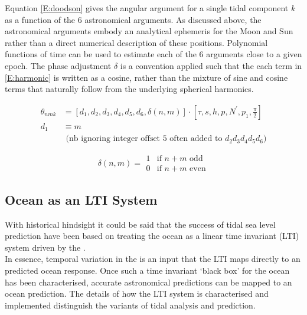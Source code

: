 Equation \ref{E:doodson} gives the angular argument for a single tidal component $k$ as a function of the 6 astronomical arguments.   As discussed above, the astronomical arguments embody an analytical ephemeris for the Moon and Sun rather than a direct numerical description of these positions.  Polynomial functions of time can be used to estimate each of the 6 arguments close to a given epoch.  The phase adjustment $\delta$ is a convention applied such that the each term in \ref{E:harmonic} is written as a cosine, rather than the mixture of sine and cosine terms that naturally follow from the underlying spherical harmonics.

\begin{align}
\label{E:doodson}
\theta_{nmk}  &= \left[ d_1 , d_2 , d_3 , d_4 , d_5 ,d_6 , \delta(n,m)  \right] \cdot \left[ \tau , s  , h , p , N^\prime , p_1 , \frac{\pi}{2}   \right]   \\
          d_1 &\equiv m \nonumber \\
              & \mbox{ (nb ignoring integer offset 5 often added to $d_2d_3d_4d_5d_6$)} \nonumber
\end{align}

\begin{equation}
\delta(n,m)  =     \begin{array}{ll}
                    1 & \mbox{if $n+m$ odd}  \\
                    0 & \mbox{if $n+m$ even} 
                    \end{array}             
\end{equation}


\subsection{Ocean as an LTI System}
\label{S:LTI}
With historical hindsight it could be said that the success of tidal sea level prediction have been based on treating the ocean as a linear time invariant (LTI) system driven by the \ATGP{}.\\
In essence, temporal variation in the \ATGP{} is an input that the LTI maps directly to an predicted ocean response.  Once such a time invariant `black box' for the ocean has been characterised,  accurate astronomical predictions can be mapped to an ocean prediction.  The details of how the LTI system is characterised and implemented distinguish the variants of tidal analysis and prediction.\\




